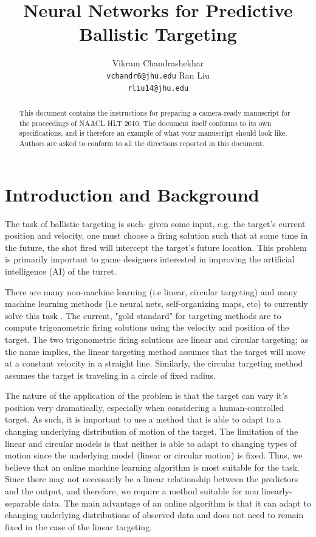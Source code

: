 \documentclass[11pt,letterpaper]{article}
\title{Neural Networks for Predictive Ballistic Targeting}
\author{Vikram Chandrashekhar\\
  {\tt vchandr6@jhu.edu}
  \And
  Ran Liu \\
  {\tt rliu14@jhu.edu}}
\date{}
\begin{document}
\maketitle

\begin{abstract}
  This document contains the instructions for preparing a camera-ready
  manuscript for the proceedings of NAACL HLT 2010. The document itself conforms
  to its own specifications, and is therefore an example of what
  your manuscript should look like.  Authors are asked to conform to
  all the directions reported in this document.
\end{abstract}

\section{Introduction and Background}

The task of ballistic targeting is such- given some input, e.g. the target's current position and velocity, one must choose a firing solution such that at some time in the future, the shot fired will intercept the target's future location. This problem is primarily important to game designers interested in improving the artificial intelligence (AI) of the turret.

There are many non-machine learning (i.e linear, circular targeting) and many machine learning methods (i.e neural nets, self-organizing maps, etc) to currently solve this task \cite{Guesgen_anartificial}. The current, "gold standard" for targeting methods are to compute trigonometric firing solutions using the velocity and position of the target. The two trigonometric firing solutions are linear and circular targeting; as the name implies, the linear targeting method assumes that the target will move at a constant velocity in a straight line. Similarly, the circular targeting method assumes the target is traveling in a circle of fixed radius.

The nature of the application of the problem is that the target can vary it's position very dramatically, especially when considering a human-controlled target. As such, it is important to use a method that is able to adapt to a changing underlying distribution of motion of the target. The limitation of the linear and circular models is that neither is able to adapt to changing types of motion since the underlying model (linear or circular motion) is fixed. Thus, we believe that an online machine learning algorithm is most suitable for the task. Since there may not necessarily be a linear relationship between the predictors and the output, and therefore, we require a method suitable for non linearly-separable data. The main advantage of an online algorithm is that it can adapt to changing underlying distributions of observed data and does not need to remain fixed in the case of the linear targeting.
\end{document}
